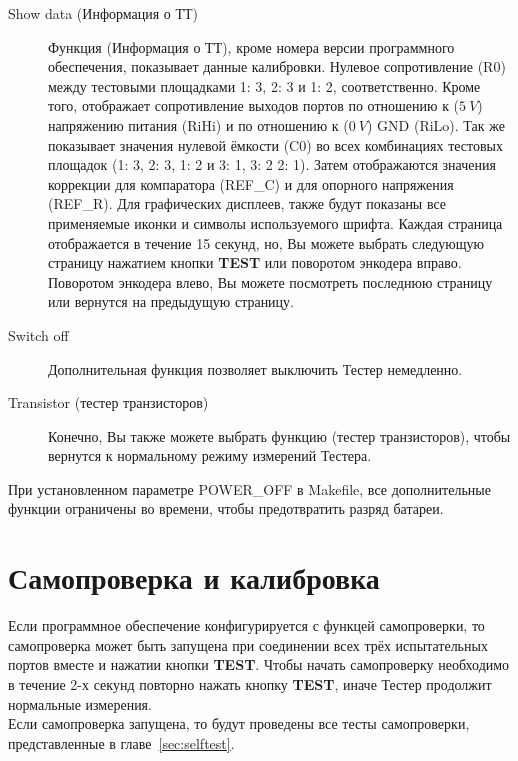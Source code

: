 \begin{description}
 \item[Show data (Информация о ТТ)]
 Функция  (Информация о ТТ), кроме номера версии программного обеспечения, показывает данные калибровки.
Нулевое сопротивление (R0) между тестовыми площадками 1: 3, 2: 3 и 1: 2, соответственно.
Кроме того, отображает сопротивление выходов портов по отношению к (\(5~V\)) напряжению питания (RiHi) и
по отношению к (\(0~V\)) GND (RiLo).
Так же показывает значения нулевой ёмкости (C0) во всех комбинациях тестовых площадок (1: 3, 2: 3, 1: 2 и 3: 1, 3: 2 2: 1).
Затем отображаются значения коррекции для компаратора (REF\_C) и для опорного напряжения (REF\_R).
Для графических дисплеев, также будут показаны все применяемые иконки и символы используемого шрифта.
Каждая страница отображается в течение 15 секунд, но, Вы можете выбрать следующую страницу нажатием кнопки \textbf{ TEST} или поворотом 
энкодера вправо.
Поворотом энкодера влево, Вы можете посмотреть последнюю страницу или вернутся на предыдущую страницу.\\

 \item[Switch off] 
 Дополнительная функция  позволяет выключить Тестер немедленно.\\ 

 \item[Transistor (тестер транзисторов)]
 Конечно, Вы также можете выбрать функцию  (тестер транзисторов), чтобы вернутся к нормальному режиму измерений Тестера.
\end{description}

При установленном параметре POWER\_OFF в Makefile, все дополнительные функции ограничены во времени, чтобы предотвратить разряд батареи.


\section{Самопроверка и калибровка}

Если программное обеспечение конфигурируется с функцей самопроверки, то самопроверка может быть запущена 
при соединении всех трёх испытательных портов вместе и нажатии кнопки \textbf{ TEST}. Чтобы начать самопроверку 
необходимо в течение 2-х секунд повторно нажать кнопку \textbf{ TEST}, иначе Тестер продолжит нормальные 
измерения.\\

Если самопроверка запущена, то будут проведены все тесты самопроверки, представленные в главе~\ref{sec:selftest}.\\


